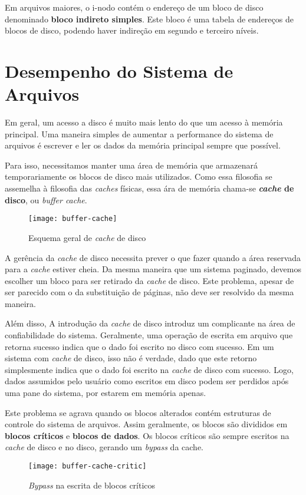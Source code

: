 Em arquivos maiores, o i-nodo contém o endereço de um bloco de disco denominado \textbf{bloco indireto simples}. Este bloco é uma tabela de endereços de blocos de disco, podendo haver indireção em segundo e terceiro níveis.

\section{Desempenho do Sistema de Arquivos}
Em geral, um acesso a disco é muito mais lento do que um acesso à memória principal. Uma maneira simples de aumentar a performance do sistema de arquivos é escrever e ler os dados da memória principal sempre que possível.

Para isso, necessitamos manter uma área de memória que armazenará temporariamente os blocos de disco mais utilizados. Como essa filosofia se assemelha à filosofia das \textit{caches} físicas, essa ára de memória chama-se \textbf{\textit{cache} de disco}, ou \textit{buffer cache}.

\begin{figure}[h]
  \centering
  \texttt{[image: buffer-cache]}
  \caption{Esquema geral de \textit{cache} de disco}
  \label{fig:buffer-cache}
\end{figure}

A gerência da \textit{cache} de disco necessita prever o que fazer quando a área reservada para a \textit{cache} estiver cheia. Da mesma maneira que um sistema paginado, devemos escolher um bloco para ser retirado da \textit{cache} de disco. Este problema, apesar de ser parecido com o da substituição de páginas, não deve ser resolvido da mesma maneira.

Além disso, A introdução da \textit{cache} de disco introduz um complicante na área de confiabilidade do sistema. Geralmente, uma operação de escrita em arquivo que retorna sucesso indica que o dado foi escrito no disco com sucesso. Em um sistema com \textit{cache} de disco, isso não é verdade, dado que este retorno simplesmente indica que o dado foi escrito na \textit{cache} de disco com sucesso. Logo, dados assumidos pelo usuário como escritos em disco podem ser perdidos após uma pane do sistema, por estarem em memória apenas.

Este problema se agrava quando os blocos alterados contém estruturas de controle do sistema de arquivos. Assim geralmente, os blocos são divididos em \textbf{blocos críticos} e \textbf{blocos de dados}. Os blocos críticos são sempre escritos na \textit{cache} de disco e no disco, gerando um \textit{bypass} da cache.

\begin{figure}[h]
  \centering
  \texttt{[image: buffer-cache-critic]}
  \caption{\textit{Bypass} na escrita de blocos críticos}
  \label{fig:buffer-cache-critic}
\end{figure}
